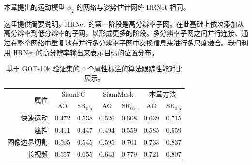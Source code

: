 本章提出的运动模型 $\phi_{2}$ 的网络与姿势估计网络 HRNet \cite{sun2019deep} 相同。

这里提供简要说明。HRNet 的第一阶段是高分辨率子网。在此基础上依次添加从高分辨率到低分辨率的子网，以形成更多的阶段。多分辨率子网之间并行连接。通过在整个网络中重复地在并行多分辨率子网中交换信息来进行多尺度融合。我们利用 HRNet 的高分辨率输出来表示目标的位置分布。

\begin{table}[t]
\centering
\caption{基于 GOT-10k \cite{GOT-10k} 验证集的 4 个属性标注的算法跟踪性能对比展示。}
\begin{tabular}{@{}rcccccc@{}}
\toprule
\multirow{2}{*}{属性} & \multicolumn{2}{c}{SiamFC} & \multicolumn{2}{c}{SiamMask} & \multicolumn{2}{c}{本章方法} \\ \cmidrule(lr){2-3} \cmidrule(lr){4-5} \cmidrule(lr){6-7} 
 & AO & SR$_{0.5}$ & AO & SR$_{0.5}$ & AO & SR$_{0.5}$ \\ \midrule
快速运动 & 0.472 & 0.538 & 0.526 & 0.608 & 0.639 & 0.715 \\
遮挡 & 0.411 & 0.447 & 0.494 & 0.559 & 0.585 & 0.659 \\
图像边界切割 & 0.505 & 0.545 & 0.595 & 0.701 & 0.738 & 0.837 \\
长视频 & 0.557 & 0.655 & 0.643 & 0.779 & 0.721 & 0.807 \\ \bottomrule
\end{tabular}%
\label{table:attribute}
\end{table}

